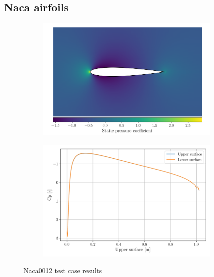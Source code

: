 \documentclass{article}
\begin{document}
\subsection{Naca airfoils}

\begin{figure}[H]
    \centering
    \begin{subfigure}{0.49\textwidth}
        \centering
        \includegraphics[width=0.99\textwidth]{figures/naca0012_cp.png}
        \caption{}
        \label{fig:naca0012_cp}
    \end{subfigure}
    \begin{subfigure}{0.49\textwidth}
        \centering
        \includegraphics[width=0.99\textwidth]{figures/naca0012_surface_cp.png}
        \caption{}
        \label{fig:naca0012_mach}
    \end{subfigure}
    \caption{Naca0012 test case results}
\end{figure}
\end{document}
